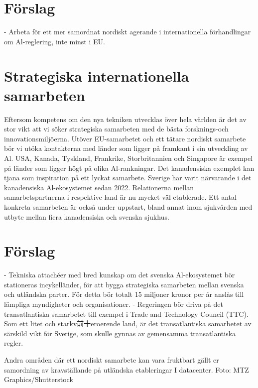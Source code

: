 {{{{{{{{{{{\section*{Förslag}
- Arbeta för ett mer samordnat nordiskt agerande i internationella förhandlingar om Al-reglering, inte minst i EU.
\section*{Strategiska internationella samarbeten}
Eftersom kompetens om den nya tekniken utvecklas över hela världen är det av stor vikt att vi söker strategiska samarbeten med de bästa forsknings-och innovationsmiljöerna.
Utöver EU-samarbetet och ett tätare nordiskt samarbete bör vi utöka kontakterna med länder som ligger på framkant i sin utveckling av Al. USA, Kanada, Tyskland, Frankrike, Storbritannien och Singapore är exempel på länder som ligger högt på olika Al-rankningar. Det kanadensiska exemplet kan tjana som inspiration på ett lyckat samarbete. Sverige har varit närvarande i det kanadensiska Al-ekosystemet sedan 2022. Relationerna mellan samarbetspartnerna i respektive land är nu mycket väl etablerade. Ett antal konkreta samarbeten är också under uppstart, bland annat inom sjukvården med utbyte mellan fiera kanadensiska och svenska sjukhus.
\section*{Förslag}
- Tekniska attachéer med bred kunskap om det svenska Al-ekosystemet bör stationeras incykelländer, för att bygga strategiska samarbeten mellan svenska och utländska parter. För detta bör totalt 15 miljoner kronor per år anslås till lämpliga myndigheter och organisationer.
- Regeringen bör driva på det transatlantiska samarbetet till exempel i Trade and Technology Council (TTC). Som ett litet och starkv前十eroerende land, är det transatlantiska samarbetet av särskild vikt för Sverige, som skulle gynnas av gemensamma transatlantiska regler.

Andra områden där ett nordiskt samarbete kan vara fruktbart gällt er samordning av kravställande på utländska etableringar I datacenter. Foto: MTZ Graphics/Shutterstock

}}}}}}}}}}}
